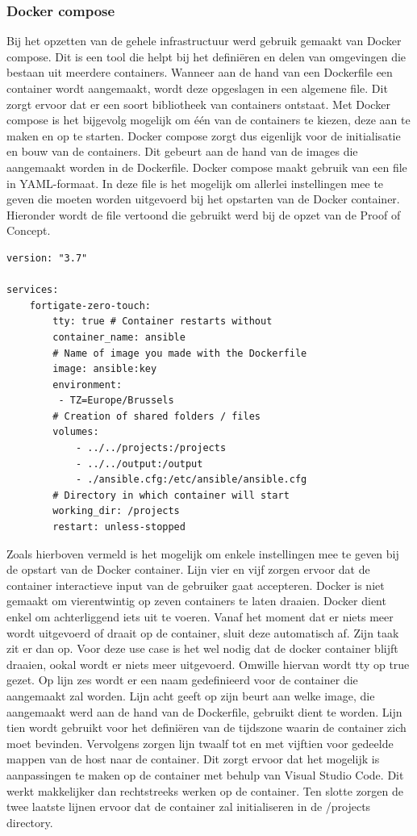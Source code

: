 \subsubsection{Docker compose}
Bij het opzetten van de gehele infrastructuur werd gebruik gemaakt van Docker compose. Dit is een tool die helpt bij het definiëren en delen van omgevingen die bestaan uit meerdere containers. Wanneer aan de hand van een Dockerfile een container wordt aangemaakt, wordt deze opgeslagen in een algemene file. Dit zorgt ervoor dat er een soort bibliotheek van containers ontstaat. Met Docker compose is het bijgevolg mogelijk om één van de containers te kiezen, deze aan te maken en op te starten. Docker compose zorgt dus eigenlijk voor de initialisatie en bouw van de containers. Dit gebeurt aan de hand van de images die aangemaakt worden in de Dockerfile. Docker compose maakt gebruik van een file in YAML-formaat. In deze file is het mogelijk om allerlei instellingen mee te geven die moeten worden uitgevoerd bij het opstarten van de Docker container. Hieronder wordt de file vertoond die gebruikt werd bij de opzet van de Proof of Concept. \newline
\newpage
\begin{lstlisting}[caption={docker-compose.yaml}]
version: "3.7"

services:
    fortigate-zero-touch:
        tty: true # Container restarts without
        container_name: ansible
        # Name of image you made with the Dockerfile
        image: ansible:key
        environment:
         - TZ=Europe/Brussels 
        # Creation of shared folders / files     
        volumes:
            - ../../projects:/projects
            - ../../output:/output
            - ./ansible.cfg:/etc/ansible/ansible.cfg
        # Directory in which container will start
        working_dir: /projects
        restart: unless-stopped
\end{lstlisting}

Zoals hierboven vermeld is het mogelijk om enkele instellingen mee te geven bij de opstart van de Docker container. Lijn vier en vijf zorgen ervoor dat de container interactieve input van de gebruiker gaat accepteren. Docker is niet gemaakt om vierentwintig op zeven containers te laten draaien. Docker dient enkel om achterliggend iets uit te voeren. Vanaf het moment dat er niets meer wordt uitgevoerd of draait op de container, sluit deze automatisch af. Zijn taak zit er dan op. Voor deze use case is het wel nodig dat de docker container blijft draaien, ookal wordt er niets meer uitgevoerd. Omwille hiervan wordt tty op true gezet. Op lijn zes wordt er een naam gedefinieerd voor de container die aangemaakt zal worden. Lijn acht geeft op zijn beurt aan welke image, die aangemaakt werd aan de hand van de Dockerfile, gebruikt dient te worden. Lijn tien wordt gebruikt voor het definiëren van de tijdszone waarin de container zich moet bevinden. Vervolgens zorgen lijn twaalf tot en met vijftien voor gedeelde mappen van de host naar de container. Dit zorgt ervoor dat het mogelijk is aanpassingen te maken op de container met behulp van Visual Studio Code. Dit werkt makkelijker dan rechtstreeks werken op de container. Ten slotte zorgen de twee laatste lijnen ervoor dat de container zal initialiseren in de /projects directory.

